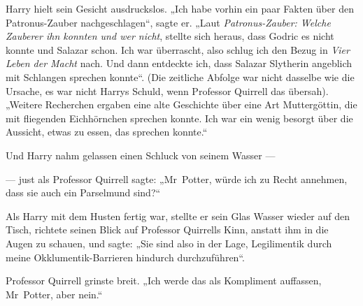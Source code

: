 Harry hielt sein Gesicht ausdruckslos.
„Ich habe vorhin ein paar Fakten über den Patronus-Zauber nachgeschlagen“, sagte er.
„Laut \emph{Patronus-Zauber: Welche Zauberer ihn konnten und wer nicht}, stellte sich heraus, dass Godric es nicht konnte und Salazar schon. Ich war überrascht, also schlug ich den Bezug in \emph{Vier Leben der Macht} nach. Und dann entdeckte ich, dass Salazar Slytherin angeblich mit Schlangen sprechen konnte“. (Die zeitliche Abfolge war nicht dasselbe wie die Ursache, es war nicht Harrys Schuld, wenn Professor Quirrell das übersah).
„Weitere Recherchen ergaben eine alte Geschichte über eine Art Muttergöttin, die mit fliegenden Eichhörnchen sprechen konnte. Ich war ein wenig besorgt über die Aussicht, etwas zu essen, das sprechen konnte.“

Und Harry nahm gelassen einen Schluck von seinem Wasser —

— just als Professor Quirrell sagte:
„Mr~Potter, würde ich zu Recht annehmen, dass sie auch ein Parselmund sind?“

Als Harry mit dem Husten fertig war, stellte er sein Glas Wasser wieder auf den Tisch, richtete seinen Blick auf Professor Quirrells Kinn, anstatt ihm in die Augen zu schauen, und sagte:
„Sie sind also in der Lage, Legilimentik durch meine Okklumentik-Barrieren hindurch durchzuführen“.

Professor Quirrell grinste breit.
„Ich werde das als Kompliment auffassen, Mr~Potter, aber nein.“

